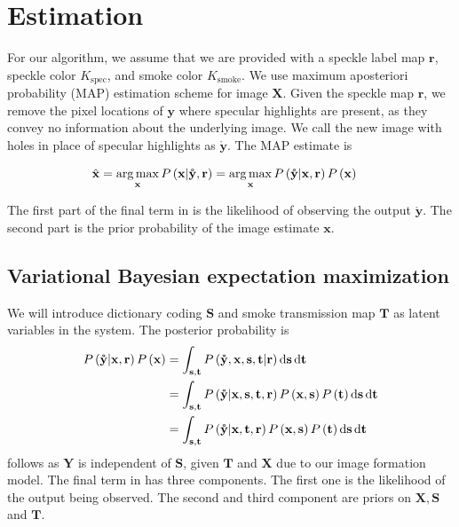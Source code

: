 \chapter{Estimation}

For our algorithm, we assume that we are provided with a speckle label map $\mathbf{r}$, speckle color $K_\text{spec}$, and smoke color $K_\text{smoke}$. We use maximum aposteriori probability (MAP) estimation scheme for image $\mathbf{X}$. Given the speckle map $\mathbf{r}$, we remove the pixel locations of $\mathbf{y}$ where specular highlights are present, as they convey no information about the underlying image. We call the new image with holes in place of specular highlights as $\mathbf{\mathring y}$. The MAP estimate is

\begin{align}
\hat{\mathbf{x}} &= \operatorname*{arg\,max}_\mathbf{x} P \left( \mathbf{x} | \mathbf{\mathring y}, \mathbf{r} \right) = \operatorname*{arg\,max}_\mathbf{x} P \left( \mathbf{\mathring y} | \mathbf{x}, \mathbf{r} \right) P \left( \mathbf{x} \right) \label{eqn:simplemap}
\end{align}

The first part of the final term in  is the likelihood of observing the output $\mathbf{\mathring y}$. The second part is the prior probability of the image estimate $\mathbf{x}$.


\section{Variational Bayesian expectation maximization}
We will introduce dictionary coding $\mathbf{S}$ and smoke transmission map $\mathbf{T}$ as latent variables in the system. The posterior probability is 
\begin{align}
P \left( \mathbf{\mathring y} | \mathbf{x}, \mathbf{r} \right) P \left( \mathbf{x} \right) &= \int_{\mathbf{s}, \mathbf{t}} P \left( \mathbf{\mathring y}, \mathbf{x}, \mathbf{s}, \mathbf{t} | \mathbf{r} \right) \mathop{}\!\mathrm{d} \mathbf{s} \mathop{}\!\mathrm{d}\mathbf{t} \\
&= \int_{\mathbf{s}, \mathbf{t}} P \left( \mathbf{\mathring y} | \mathbf{x}, \mathbf{s},  \mathbf{t}, \mathbf{r} \right)  P \left(\mathbf{x}, \mathbf{s} \right) P \left( \mathbf{t} \right) \mathop{}\!\mathrm{d}\mathbf{s} \mathop{}\!\mathrm{d}\mathbf{t} \label{eqn:mapDerive1}\\
&= \int_{\mathbf{s}, \mathbf{t}} P \left( \mathbf{\mathring y} | \mathbf{x}, \mathbf{t}, \mathbf{r} \right)  P \left(\mathbf{x}, \mathbf{s} \right) P \left( \mathbf{t} \right) \mathop{}\!\mathrm{d}\mathbf{s} \mathop{}\!\mathrm{d}\mathbf{t}  \label{eqn:mapDerive2}
\end{align}
 follows as $\mathbf{Y}$ is independent of $\mathbf{S}$, given $\mathbf{T}$ and $\mathbf{X}$ due to our image formation model.
The final term in  has three components. The first one is the likelihood of the output being observed. The second and third component are priors on $\mathbf{X}, \mathbf{S}$ and $\mathbf{T}$.

